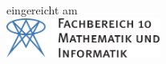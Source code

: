\begin{titlepage}
  \vfill

	{\large eingereicht am \thedate}\\[1cm] %


	\includegraphics[height=1.3cm,keepaspectratio]{Bilder/fb10logo.pdf}\\[1cm] %
 

	
\end{titlepage}

